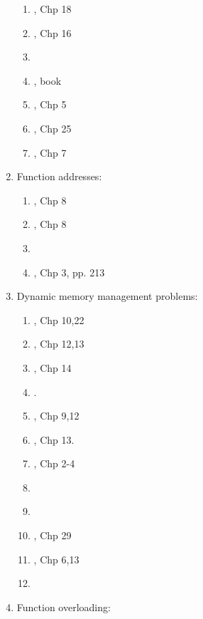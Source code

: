 \begin{enumerate}
\begin{enumerate}
	\item \cite{Allain2012}, Chp 18
	\item \cite{Prata2012}, Chp 16
	\item \cite[\S18.3, pp. 977-991]{Savitch2009}
	\item \cite{Reese2006a}, book
	\item \cite{Eckel2003}, Chp 5
	\item \cite{Oualline2003}, Chp 25
	\item \cite{Vermeir2001}, Chp 7
	\end{enumerate}
\item Function addresses: \vspace{-0.3cm}
	\begin{enumerate} \itemsep -2pt
	\item \cite{Stroustrup2014}, Chp 8
	\item \cite{Stroustrup2009}, Chp 8
	\item \cite[pp. 330--331]{Prata2005}
	\item \cite{Eckel2000}, Chp 3, pp. 213
	\end{enumerate}
\item Dynamic memory management problems: \vspace{-0.3cm}
	\begin{enumerate} \itemsep -2pt
	\item \cite{Gregoire2014}, Chp 10,22
	\item \cite{Lippman2013}, Chp 12,13
	\item \cite{Allain2012}, Chp 14
	\item \cite[\S13.9, 750--754]{Gaddis2012}.
	\item \cite{Prata2012}, Chp 9,12
	\item \cite{Gaddis2010}, Chp 13.
	\item \cite{Meyers2005}, Chp 2-4
	\item \cite[Chp. 9, pp. 393--423; Chp. 12, pp. 562--606; Chp. 13, pp. 677--685]{Prata2005}
	\item \cite[\S3.1; \S8.1]{Romanik2003}
	\item \cite{Schildt2003}, Chp 29
	\item \cite{Eckel2000}, Chp 6,13
	\item \cite[pp. 349--359]{Schildt1998a}
	\end{enumerate}
\item Function overloading: \vspace{-0.3cm}

\end{enumerate}
